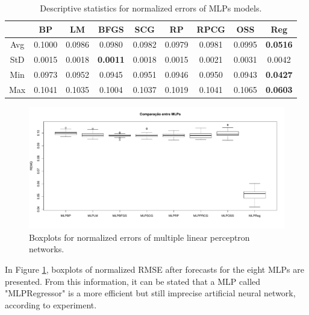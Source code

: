 \begin{table}[h]
\caption{Descriptive statistics for normalized errors of MLPs models.}\label{tab:mlps_descriptive} \centering
\begin{tabular}{|c|c|c|c|c|c|c|c|c|}
  \hline
   & BP & LM & BFGS & SCG & RP & RPCG & OSS & Reg \\
  \hline
  Avg & 0.1000 & 0.0986 & 0.0980 & 0.0982 & 0.0979 & 0.0981 & 0.0995 & \textbf{0.0516}   \\
  \hline
  StD & 0.0015 & 0.0018 & \textbf{0.0011} & 0.0018 & 0.0015 & 0.0021 & 0.0031 & 0.0042   \\
  \hline
  Min & 0.0973 & 0.0952 & 0.0945 & 0.0951 & 0.0946 & 0.0950 & 0.0943 & \textbf{0.0427}   \\
  \hline
  Max & 0.1041 & 0.1035 & 0.1004 & 0.1037 & 0.1019 & 0.1041 & 0.1065 & \textbf{0.0603}   \\
  \hline
\end{tabular}
\end{table}

\begin{figure}[h]
  \vspace{-0.2cm}
  \centering
  \includegraphics[trim = 1mm 10mm 1mm 1mm,clip,width=\columnwidth]{image/mlps_ex3.pdf}
  \caption{Boxplots for normalized errors of multiple linear perceptron networks.}
  \label{fig:mlps_result}
\end{figure}

In Figure \ref{fig:mlps_result}, boxplots of normalized RMSE after forecasts for the eight MLPs are presented. From this information, it can be stated that a MLP called "MLPRegressor" is a more efficient but still imprecise artificial neural network, according to experiment.

